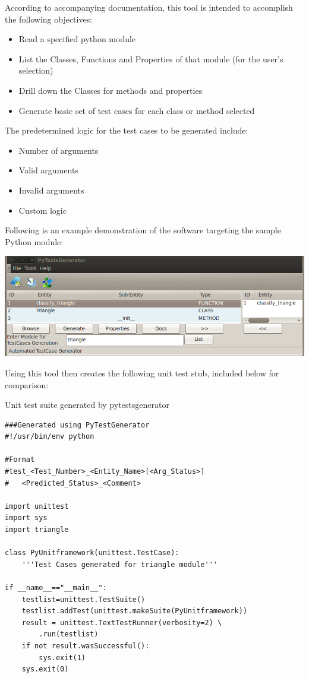 \documentclass{icldt}
\numberwithin{equation}{section}       %
\begin{document}
{According to accompanying documentation, this tool is intended to accomplish the following objectives:
\begin{itemize}
	\item Read a specified python module
	\item List the Classes, Functions and Properties of that module (for the user's selection)
	\item Drill down the Classes for methods and properties
	\item Generate basic set of test cases for each class or method selected
\end{itemize}

The predetermined logic for the test cases to be generated include:
\begin{itemize}
	\item Number of arguments
	\item Valid arguments
	\item Invalid arguments
	\item Custom logic
\end{itemize}

Following is an example demonstration of the software targeting the sample Python module:

\includegraphics[scale=.51]{img/pytestsgenerator.png}

Using this tool then creates the following unit test stub, included below for comparison:
\begin{listing}
	\caption{Unit test suite generated by \textsf{pytestsgenerator}}
	\begin{verbatim}
###Generated using PyTestGenerator
#!/usr/bin/env python

#Format
#test_<Test_Number>_<Entity_Name>[<Arg_Status>]
#	<Predicted_Status>_<Comment>

import unittest
import sys
import triangle

class PyUnitframework(unittest.TestCase):
	'''Test Cases generated for triangle module'''

if __name__=="__main__":
	testlist=unittest.TestSuite()
	testlist.addTest(unittest.makeSuite(PyUnitframework))
	result = unittest.TextTestRunner(verbosity=2) \
		.run(testlist)
	if not result.wasSuccessful():
		sys.exit(1)
	sys.exit(0)
	\end{verbatim}
	\label{lst:py-triangle-pytestsgenerator}
\end{listing}

}
\end{document}
